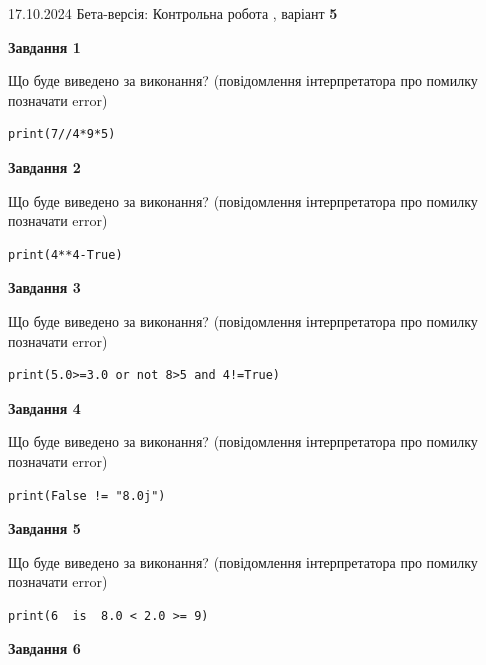 \documentclass[12pt, ukrainian]{article}
\begin{document}
{\Large{17.10.2024 Бета-версія: Контрольна робота , варіант  \No \textbf { 5 }\par}}
{
\begin {large}
{\begin {center}\textbf{Завдання 1}\end {center}}

Що буде виведено за виконання? (повідомлення інтерпретатора про помилку позначати error)\par
\begin{verbatim}
print(7//4*9*5)
\end{verbatim}

{\begin {center}\textbf{Завдання 2}\end {center}}

Що буде виведено за виконання? (повідомлення інтерпретатора про помилку позначати error)\par
\begin{verbatim}
print(4**4-True)
\end{verbatim}

{\begin {center}\textbf{Завдання 3}\end {center}}

Що буде виведено за виконання? (повідомлення інтерпретатора про помилку позначати error)\par
\begin{verbatim}
print(5.0>=3.0 or not 8>5 and 4!=True)
\end{verbatim}

{\begin {center}\textbf{Завдання 4}\end {center}}

Що буде виведено за виконання? (повідомлення інтерпретатора про помилку позначати error)\par
\begin{verbatim}
print(False != "8.0j")
\end{verbatim}

{\begin {center}\textbf{Завдання 5}\end {center}}

Що буде виведено за виконання? (повідомлення інтерпретатора про помилку позначати error)\par
\begin{verbatim}
print(6  is  8.0 < 2.0 >= 9)
\end{verbatim}

{\begin {center}\textbf{Завдання 6}\end {center}}


\end{large}}
\end{document}

